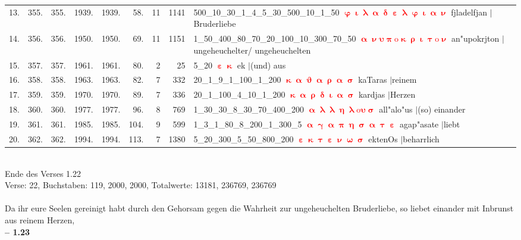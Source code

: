 \documentclass[a4paper,10pt,landscape]{article}
\begin{document}
\begin{tabular}{rrrrrrrrp{120mm}}
13.&355.&355.&1939.&1939.&58.&11&1141&500\_10\_30\_1\_4\_5\_30\_500\_10\_1\_50 \textcolor{red}{$\boldsymbol{\upvarphi\upiota\uplambda\upalpha\updelta\upepsilon\uplambda\upvarphi\upiota\upalpha\upnu}$} fjladelfjan $|$Bruderliebe\\
14.&356.&356.&1950.&1950.&69.&11&1151&1\_50\_400\_80\_70\_20\_100\_10\_300\_70\_50 \textcolor{red}{$\boldsymbol{\upalpha\upnu\upsilon\uppi\mathrm{o}\upkappa\uprho\upiota\uptau\mathrm{o}\upnu}$} an"upokrjton $|$ ungeheuchelter/ ungeheuchelten\\
15.&357.&357.&1961.&1961.&80.&2&25&5\_20 \textcolor{red}{$\boldsymbol{\upepsilon\upkappa}$} ek $|$(und) aus\\
16.&358.&358.&1963.&1963.&82.&7&332&20\_1\_9\_1\_100\_1\_200 \textcolor{red}{$\boldsymbol{\upkappa\upalpha\upvartheta\upalpha\uprho\upalpha\upsigma}$} kaTaras $|$reinem\\
17.&359.&359.&1970.&1970.&89.&7&336&20\_1\_100\_4\_10\_1\_200 \textcolor{red}{$\boldsymbol{\upkappa\upalpha\uprho\updelta\upiota\upalpha\upsigma}$} kardjas $|$Herzen\\
18.&360.&360.&1977.&1977.&96.&8&769&1\_30\_30\_8\_30\_70\_400\_200 \textcolor{red}{$\boldsymbol{\upalpha\uplambda\uplambda\upeta\uplambda\mathrm{o}\upsilon\upsigma}$} all"alo"us $|$(so) einander\\
19.&361.&361.&1985.&1985.&104.&9&599&1\_3\_1\_80\_8\_200\_1\_300\_5 \textcolor{red}{$\boldsymbol{\upalpha\upgamma\upalpha\uppi\upeta\upsigma\upalpha\uptau\upepsilon}$} agap"asate $|$liebt\\
20.&362.&362.&1994.&1994.&113.&7&1380&5\_20\_300\_5\_50\_800\_200 \textcolor{red}{$\boldsymbol{\upepsilon\upkappa\uptau\upepsilon\upnu\upomega\upsigma}$} ektenOs $|$beharrlich\\
\end{tabular}\medskip \\
Ende des Verses 1.22\\
Verse: 22, Buchstaben: 119, 2000, 2000, Totalwerte: 13181, 236769, 236769\\
\\
Da ihr eure Seelen gereinigt habt durch den Gehorsam gegen die Wahrheit zur ungeheuchelten Bruderliebe, so liebet einander mit Inbrunst aus reinem Herzen,\\
\newpage 
{\bf -- 1.23}\\
\medskip \\
\end{document}
